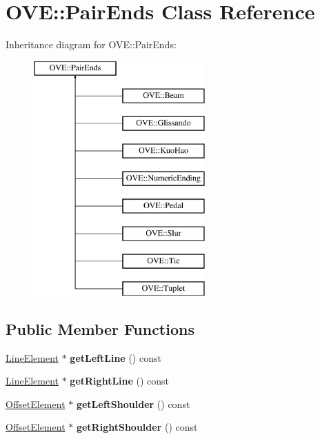 \hypertarget{class_o_v_e_1_1_pair_ends}{}\section{O\+VE\+:\+:Pair\+Ends Class Reference}
\label{class_o_v_e_1_1_pair_ends}
Inheritance diagram for O\+VE\+:\+:Pair\+Ends\+:\begin{figure}[H]
\begin{center}
\leavevmode
\includegraphics[height=9.000000cm]{class_o_v_e_1_1_pair_ends}
\end{center}
\end{figure}
\subsection*{Public Member Functions}
\begin{DoxyCompactItemize}
\item 
\mbox{\label{class_o_v_e_1_1_pair_ends_aa3bb6dfe57e248bbc333876021b8a57e}} 
\hyperlink{class_o_v_e_1_1_line_element}{Line\+Element} $\ast$ {\bfseries get\+Left\+Line} () const
\item 
\mbox{\label{class_o_v_e_1_1_pair_ends_a62ac78854a8af8a4da8701adf4f187af}} 
\hyperlink{class_o_v_e_1_1_line_element}{Line\+Element} $\ast$ {\bfseries get\+Right\+Line} () const
\item 
\mbox{\label{class_o_v_e_1_1_pair_ends_a6ce83df6bec550623191515b2bfea023}} 
\hyperlink{class_o_v_e_1_1_offset_element}{Offset\+Element} $\ast$ {\bfseries get\+Left\+Shoulder} () const
\item 
\mbox{\label{class_o_v_e_1_1_pair_ends_adb243afef8a4343eb9d61aeaaec19b90}} 
\hyperlink{class_o_v_e_1_1_offset_element}{Offset\+Element} $\ast$ {\bfseries get\+Right\+Shoulder} () const
\end{DoxyCompactItemize}


